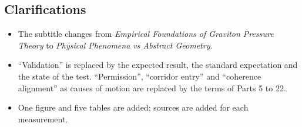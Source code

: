 \subsection*{Clarifications}
\begin{itemize}
\item The subtitle changes from \emph{Empirical Foundations of Graviton Pressure Theory} to \emph{Physical Phenomena vs Abstract Geometry}.
\item ``Validation'' is replaced by the expected result, the standard expectation and the state of the test. ``Permission'', ``corridor entry'' and ``coherence alignment'' as causes of motion are replaced by the terms of Parts 5 to 22.
\item One figure and five tables are added; sources are added for each measurement.
\end{itemize}



